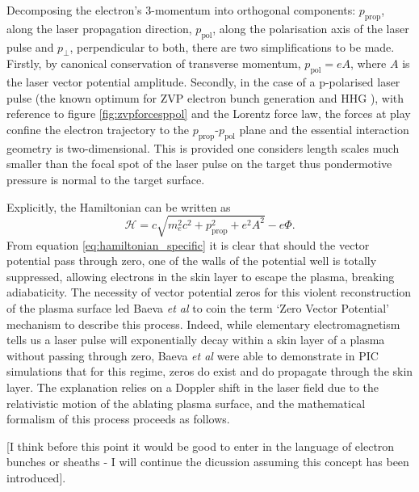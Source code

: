 Decomposing the electron's 3-momentum into orthogonal components: $p_\mathrm{prop}$, along the laser propagation direction, $p_\mathrm{pol}$, along the polarisation axis of the laser pulse and $p_\perp$, perpendicular to both, there are two simplifications to be made. Firstly, by canonical conservation of transverse momentum, $p_\mathrm{pol} = eA$, where $A$ is the laser vector potential amplitude. Secondly, in the case of a p-polarised laser pulse (the known optimum for ZVP electron bunch generation \cite{savinAttosecondscaleAbsorptionExtreme2017} and \ac{HHG} \cite{baevaTheoryHighorderHarmonic2006}), with reference to figure \ref{fig:zvpforcesppol} and the Lorentz force law, the forces at play confine the electron trajectory to the  $p_\mathrm{prop}$-$p_\mathrm{pol}$ plane and the essential interaction geometry is two-dimensional. This is provided one considers length scales much smaller than the focal spot of the laser pulse on the target thus pondermotive pressure is normal to the target surface.

Explicitly, the Hamiltonian can be written as
\begin{equation}\label{eq:hamiltonian_specific}
	\mathcal{H} = c\sqrt{m^2_ec^2 + p^2_\mathrm{prop} + e^2A^2} - e\Phi.
\end{equation}
From equation \ref{eq:hamiltonian_specific} it is clear that should the vector potential pass through zero, one of the walls of the potential well is totally suppressed, allowing electrons in the skin layer to escape the plasma, breaking adiabaticity. The necessity of vector potential zeros for this violent reconstruction of the plasma surface led Baeva \textit{et al} \cite{baevaZeroVectorPotential2011} to coin the term `Zero Vector Potential' mechanism to describe this process. Indeed, while elementary electromagnetism tells us a laser pulse will exponentially decay within a skin layer of a plasma without passing through zero, Baeva \textit{et al} \cite{baevaZeroVectorPotential2011} were able to demonstrate in \ac{PIC} simulations that for this regime, zeros do exist and do propagate through the skin layer. The explanation relies on a Doppler shift in the laser field due to the relativistic motion of the ablating plasma surface, and the mathematical formalism of this process proceeds as follows.

[I think before this point it would be good to enter in the language of electron bunches or sheaths - I will continue the dicussion assuming this concept has been introduced].

